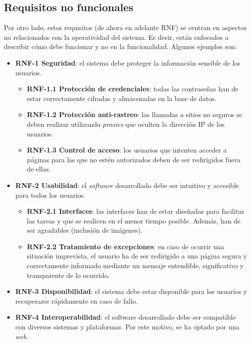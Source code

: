 \subsection{Requisitos no funcionales}
\label{s:requisitos-no-funcionales}

Por otro lado, estos requisitos (de ahora en adelante RNF) se centran en aspectos no relacionados con la operatividad del sistema. Es decir, están enfocados a describir cómo debe funcionar y no en la funcionalidad. Algunos ejemplos son:


\begin{itemize}
	\item \textbf{RNF-1 Seguridad}: el sistema debe proteger la información sensible de los usuarios.
	\begin{itemize}
		\item \textbf{RNF-1.1 Protección de credenciales}: todas las contraseñas han de estar correctamente cifradas y almacenadas en la base de datos.
		\item \textbf{RNF-1.2 Protección anti-rastreo}: las llamadas a sitios no seguros se deben realizar utilizando \textit{proxies} que oculten la dirección IP de los usuarios.
		\item \textbf{RNF-1.3 Control de acceso}: los usuarios que intenten acceder a páginas para las que no estén autorizados deben de ser redirigidos fuera de ellas.
	\end{itemize}
	\item \textbf{RNF-2 Usabilidad}: el \textit{software} desarrollado debe ser intuitivo y accesible para todos los usuarios.
	\begin{itemize}
		\item \textbf{RNF-2.1 Interfaces}: las interfaces han de estar diseñadas para facilitar las tareas y que se realicen en el menor tiempo posible. Además, han de ser agradables (inclusión de imágenes).
		\item \textbf{RNF-2.2 Tratamiento de excepciones}: en caso de ocurrir una situación imprevista, el usuario ha de ser redirigido a una página segura y correctamente informado mediante un mensaje entendible, significativo y transparente de lo ocurrido.
	\end{itemize}
	\item \textbf{RNF-3 Disponibilidad}: el sistema debe estar disponible para los usuarios y recuperarse rápidamente en caso de fallo.
	\item \textbf{RNF-4 Interoperabilidad}: el software desarrollado debe ser compatible con diversos sistemas y plataformas. Por este motivo, se ha optado por una \textit{web}.

\end{itemize}
